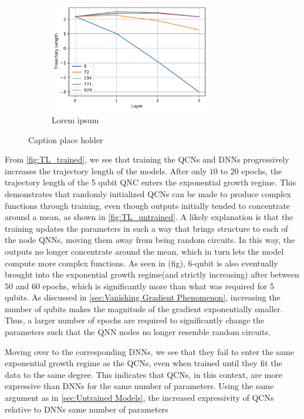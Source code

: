 \begin{figure}[H]
\begin{subfigure}[t]{0.5\textwidth}
    \end{subfigure}%
    \hfill 
    \begin{subfigure}[t]{0.5\textwidth}
        \centering
        \includegraphics[height=1.9in]{latex/figures/TL_trained_DNN_nodes_9.pdf}
        \caption{Lorem ipsum}
    \end{subfigure}
    \caption{Caption place holder}
    \label{fig:TL_trained}
\end{figure}

From \autoref{fig:TL_trained}, we see that training the QCNs and DNNs progressively increases the trajectory length of the models. After only $10$ to $20$ epochs, the trajectory length of the 5 qubit QNC enters the exponential growth regime. This demonstrates that randomly initialized QCNs can be made to produce complex functions through training, even though outputs initially tended to concentrate around a mean, as shown in \autoref{fig:TL_untrained}. A likely explanation is that the training updates the parameters in such a way that brings structure to each of the node QNNs, moving them away from being random circuits. In this way, the outputs no longer concentrate around the mean, which in turn lets the model compute more complex functions. As seen in (fig), 6-qubit is also eventually brought into the exponential growth regime(and strictly increasing) after between $50$ and $60$ epochs, which is significantly more than what was required for 5 qubits. As discussed in \autoref{sec:Vanishing Gradient Phenomenon}, increasing the number of qubits makes the magnitude of the gradient exponentially smaller. Thus, a larger number of epochs are required to significantly change the parameters such that the QNN nodes no longer resemble random circuits.

Moving over to the corresponding DNNs, we see that they fail to enter the same exponential growth regime as the QCNs, even when trained until they fit the data to the same degree. This indicates that QCNs, in this context, are more expressive than DNNs for the same number of parameters. Using the same argument as in \autoref{sec:Untrained Models}, the increased expressivity of QCNs relative to DNNs same number of parameters 

